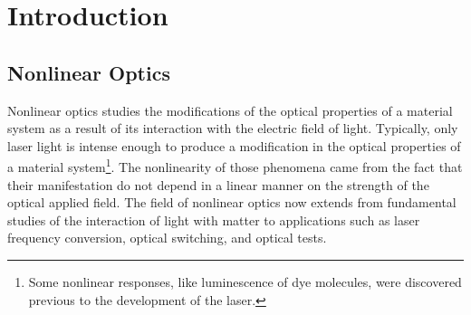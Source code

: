 \chapter{Introduction}\label{chap:introduction}
\partialtoc

\section{Nonlinear Optics}
\label{sec:nonlinear_optics}

Nonlinear optics studies the modifications of the optical properties of a
material system as a result of its interaction with the electric field of
light. Typically, only laser light is intense enough to produce a modification
in the optical properties of a material system\footnote{Some nonlinear
responses, like luminescence of dye molecules, were discovered previous to the
development of the laser.}. The nonlinearity of those phenomena came from the
fact that their manifestation do not depend in a linear manner on the strength
of the optical applied field. The field of nonlinear optics now extends from
fundamental studies of the interaction of light with matter to applications
such as laser frequency conversion, optical switching, and optical tests.

